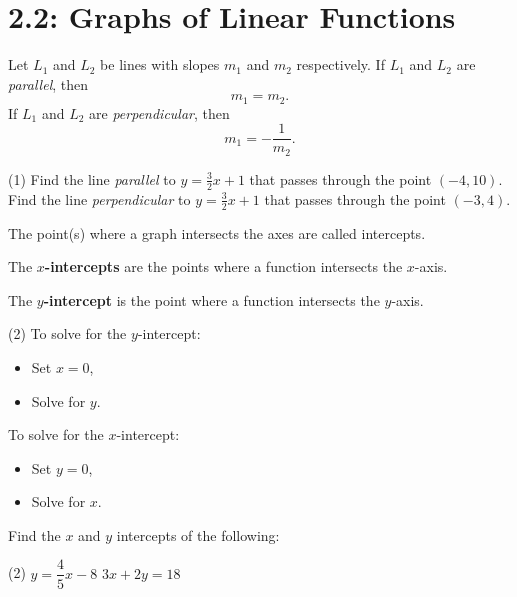 \documentclass[../mathNotesPreamble]{subfiles}
\providecommand{\relscalefact}{1.4}
\begin{document}
\relscale{\relscalefact}
  \section{2.2: Graphs of Linear Functions}

    \begin{defn*}
      Let $L_1$ and $L_2$ be lines with slopes $m_1$ and $m_2$ respectively. If $L_1$ and $L_2$ are \emph{parallel}, then
        \[m_1=m_2.\]
      If $L_1$ and $L_2$ are \emph{perpendicular}, then
        \[m_1=-\frac{1}{m_2}.\]
    \end{defn*}
    
    \begin{ex*}\mbox{}
      \begin{extasks}[after-item-skip=\stretch{1}](1)
        \task Find the line \emph{parallel} to $y=\frac{3}{2}x+1$ that passes through the point $(-4,10)$.
        \task Find the line \emph{perpendicular} to $y=\frac{3}{2}x+1$ that passes through the point $(-3,4)$.
      \end{extasks}
    \end{ex*}
    \pagebreak

    \begin{defn*}
      The point(s) where a graph intersects the axes are called intercepts. 
      
      The \textbf{$x$-intercepts} are the points where a function intersects the $x$-axis.
      
      The \textbf{$y$-intercept} is the point where a function intersects the $y$-axis.
    \end{defn*}
    \begin{tasks}[label=\textbullet](2)
      \task To solve for the $y$-intercept:
        \begin{itemize}
          \item Set $x=0$,
          \item Solve for $y$.
        \end{itemize}
      \task To solve for the $x$-intercept:
        \begin{itemize}
          \item Set $y=0$,
          \item Solve for $x$.
        \end{itemize}
    \end{tasks}
    \begin{ex*}
      Find the $x$ and $y$ intercepts of the following:
      \begin{extasks}[after-item-skip=\stretch{1}](2)
        \task $y=\dfrac{4}{5}x-8$
        \task $3x+2y=18$
      \end{extasks}
    \end{ex*}
    \pagebreak
\end{document}
